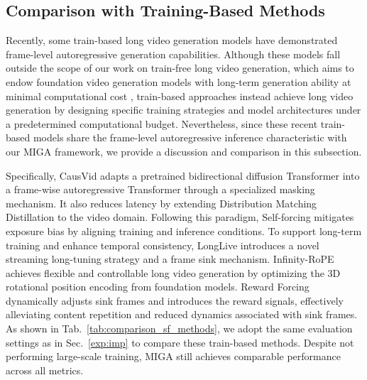 \documentclass{article}
\theoremstyle{plain}
\theoremstyle{definition}
\theoremstyle{remark}
\begin{document}
\subsection{Comparison with Training-Based Methods}
\label{app:comp_sf}

Recently, some train-based long video generation models have demonstrated frame-level autoregressive generation capabilities. 
Although these models fall outside the scope of our work on train-free long video generation, which aims to endow foundation video generation models with long-term generation ability at minimal computational cost \cite{lu2024freelong}, train-based approaches instead achieve long video generation by designing specific training strategies and model architectures under a predetermined computational budget. 
Nevertheless, since these recent train-based models share the frame-level autoregressive inference characteristic with our MIGA framework, we provide a discussion and comparison in this subsection.


Specifically, CausVid \cite{yin2025slow} adapts a pretrained bidirectional diffusion Transformer into a frame-wise autoregressive Transformer through a specialized masking mechanism. It also reduces latency by extending Distribution Matching Distillation \cite{yin2024improved,yin2024one} to the video domain.  
Following this paradigm, Self-forcing \cite{huang2025self} mitigates exposure bias by aligning training and inference conditions. To support long-term training and enhance temporal consistency, LongLive \cite{yang2025longlive} introduces a novel streaming long-tuning strategy and a frame sink mechanism.  
Infinity-RoPE \cite{yesiltepe2025infinity} achieves flexible and controllable long video generation by optimizing the 3D rotational position encoding  from foundation models.
Reward Forcing \cite{lu2025reward} dynamically adjusts sink frames and introduces the reward signals, effectively alleviating content repetition and reduced dynamics associated with sink frames.
As shown in Tab.~\ref{tab:comparison_sf_methods}, we adopt the same evaluation settings as in Sec.~\ref{exp:imp} to compare these train-based methods. Despite not performing large-scale training, MIGA still achieves comparable performance across all metrics.
\end{document}
